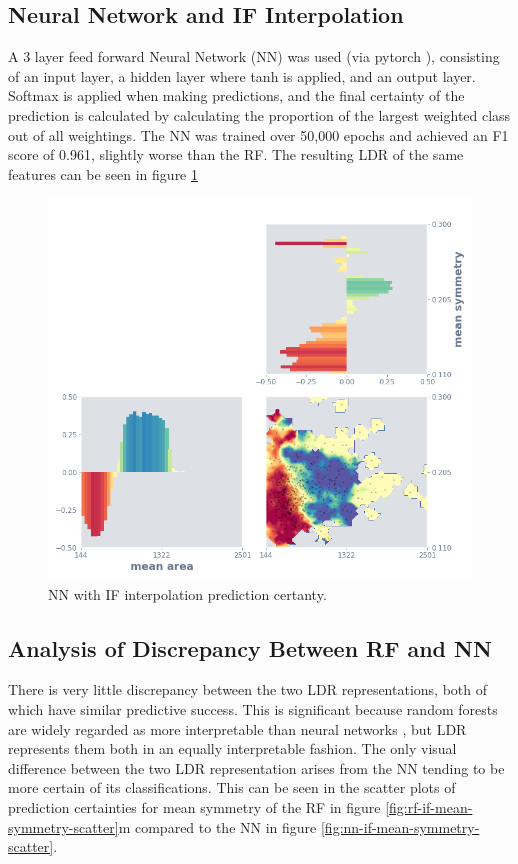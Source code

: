 \documentclass[a4paper, twocolumn]{article}
\begin{document}
\subsection{Neural Network and IF Interpolation}

A 3 layer feed forward Neural Network (NN) was used (via pytorch \cite{paszke2017automatic}), consisting of an input layer, a hidden layer where tanh is applied, and an output layer. Softmax is applied when making predictions, and the final certainty of the prediction is calculated by calculating the proportion of the largest weighted class out of all weightings. The NN was trained over 50,000 epochs and achieved an F1 score of 0.961, slightly worse than the RF. The resulting LDR of the same features can be seen in figure \ref{fig:interp-nn-if}

\begin{figure}
\centering
\includegraphics[width=0.8\columnwidth]{img/interp_nn_if.png}
\caption{NN with IF interpolation prediction certanty.}
\label{fig:interp-nn-if}
\end{figure}

\subsection{Analysis of Discrepancy Between RF and NN}

There is very little discrepancy between the two LDR representations, both of which have similar predictive success. This is significant because random forests are widely regarded as more interpretable than neural networks \cite{song2013random}, but LDR represents them both in an equally interpretable fashion. The only visual difference between the two LDR representation arises from the NN tending to be more certain of its classifications. This can be seen in the scatter plots of prediction certainties for mean symmetry of the RF in figure \ref{fig:rf-if-mean-symmetry-scatter}m compared to the NN in figure \ref{fig:nn-if-mean-symmetry-scatter}.
\end{document}
